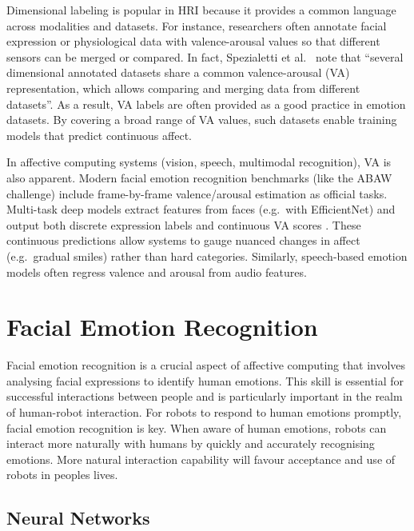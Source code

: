 Dimensional labeling is popular in HRI because it provides a common language across modalities and datasets. For instance, researchers often annotate facial expression or physiological data with valence-arousal values so that different sensors can be merged or compared. In fact, Spezialetti et al.\ \cite{Spezialetti2020-ty} note that ``several dimensional annotated datasets share a common valence-arousal (VA) representation, which allows comparing and merging data from different datasets''. As a result, VA labels are often provided as a good practice in emotion datasets. By covering a broad range of VA values, such datasets enable training models that predict continuous affect.

In affective computing systems (vision, speech, multimodal recognition), VA is also apparent. Modern facial emotion recognition benchmarks (like the ABAW challenge) include frame-by-frame valence/arousal estimation as official tasks. Multi-task deep models extract features from faces (e.g.\ with EfficientNet) and output both discrete expression labels and continuous VA scores \cite{Savchenko2024-ns}. These continuous predictions allow systems to gauge nuanced changes in affect (e.g.\ gradual smiles) rather than hard categories. Similarly, speech-based emotion models often regress valence and arousal from audio features.

\section{Facial Emotion Recognition}

Facial emotion recognition is a crucial aspect of affective computing \cite{Picard2000-mt} that involves analysing facial expressions to identify human emotions. This skill is essential for successful interactions between people and is particularly important in the realm of human-robot interaction. For robots to respond to human emotions promptly, facial emotion recognition is key. When aware of human emotions, robots can interact more naturally with humans by quickly and accurately recognising emotions. More natural interaction capability will favour acceptance and use of robots in peoples lives.

\subsection{Neural Networks}

